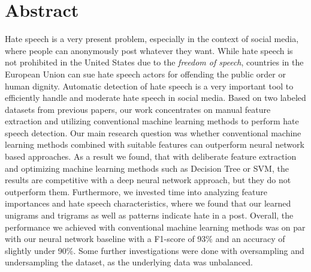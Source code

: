 \section*{Abstract}

Hate speech is a very present problem, especially in the context of social media, where people can anonymously post whatever they want. While hate speech is not prohibited in the United States due to the \textit{freedom of speech}, countries in the European Union can sue hate speech actors for offending the public order or human dignity. Automatic detection of hate speech is a very important tool to efficiently handle and moderate hate speech in social media. 
Based on two labeled datasets from previous papers, our work concentrates on manual feature extraction and utilizing conventional machine learning methods to perform hate speech detection. Our main research question was whether conventional machine learning methods combined with suitable features can outperform neural network based approaches. As a result we found, that with deliberate feature extraction and optimizing machine learning methods such as Decision Tree or SVM, the results are competitive with a deep neural network approach, but they do not outperform them. Furthermore, we invested time into analyzing feature importances and hate speech cha\-rac\-te\-ris\-tics, where we found that our learned unigrams and trigrams as well as patterns indicate hate in a post.
Overall, the performance we achieved with conventional machine learning methods was on par with our neural network baseline with a F1-score of 93\% and an accuracy of slightly under 90\%.
Some further investigations were done with oversampling and undersampling the dataset, as the underlying data was unbalanced.
